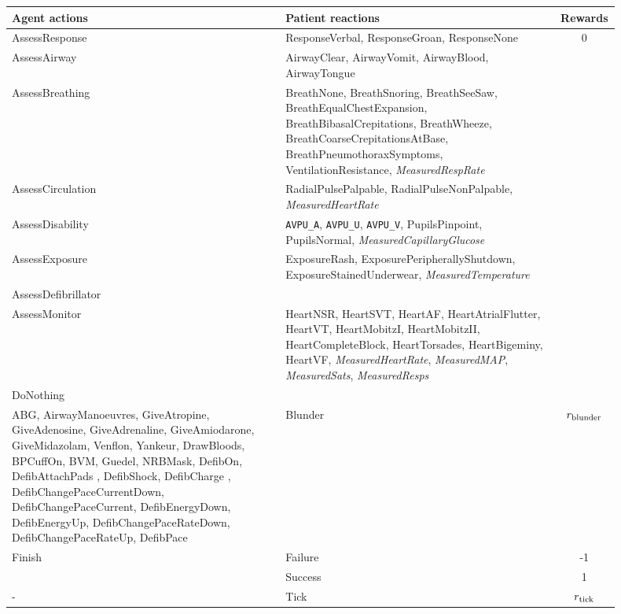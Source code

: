 \begin{tabular}{|p{0.45\linewidth}|p{0.45\linewidth}|c|}
\toprule
Agent actions &
    Patient reactions & Rewards
    \\
    \midrule
AssessResponse &
    ResponseVerbal,     ResponseGroan,     ResponseNone &
    \multirow{9}{*}{0} \\
AssessAirway &
    AirwayClear,     AirwayVomit,     AirwayBlood,     AirwayTongue &
    \\
AssessBreathing &
    BreathNone,     BreathSnoring,     BreathSeeSaw,     BreathEqualChestExpansion,     BreathBibasalCrepitations,     BreathWheeze,     BreathCoarseCrepitationsAtBase,     BreathPneumothoraxSymptoms,  VentilationResistance, \emph{MeasuredRespRate} &
    \\
AssessCirculation &
    RadialPulsePalpable,     RadialPulseNonPalpable, \emph{MeasuredHeartRate} &
    \\
AssessDisability &
    \verb|AVPU_A|,     \verb|AVPU_U|,     \verb|AVPU_V|, PupilsPinpoint,     PupilsNormal, \emph{MeasuredCapillaryGlucose} &
    \\
AssessExposure &
    ExposureRash,     ExposurePeripherallyShutdown,     ExposureStainedUnderwear, \emph{MeasuredTemperature} &
    \\
AssessDefibrillator &
    &
    \\
AssessMonitor &
    HeartNSR,
    HeartSVT,
    HeartAF,
    HeartAtrialFlutter,
    HeartVT,
    HeartMobitzI,
    HeartMobitzII,
    HeartCompleteBlock,
    HeartTorsades,
    HeartBigeminy,
    HeartVF, \emph{MeasuredHeartRate}, \emph{MeasuredMAP}, \emph{MeasuredSats}, \emph{MeasuredResps} &
    \\
    DoNothing & & \\
    \midrule
ABG,     AirwayManoeuvres,     GiveAtropine,     GiveAdenosine,     GiveAdrenaline,     GiveAmiodarone,     GiveMidazolam,     Venflon,     Yankeur,     DrawBloods,     BPCuffOn,     BVM,     Guedel,     NRBMask,     DefibOn,     DefibAttachPads ,     DefibShock,     DefibCharge ,     DefibChangePaceCurrentDown,     DefibChangePaceCurrent,     DefibEnergyDown,     DefibEnergyUp,     DefibChangePaceRateDown,     DefibChangePaceRateUp,     DefibPace& 
    Blunder & $r_\text{blunder}$
    \\
    \midrule
    \multirow{2}{*}{Finish} & Failure & -1 \\
    & Success & 1 \\
    \midrule
    - & Tick & $r_\text{tick}$ \\
    \bottomrule
\end{tabular}